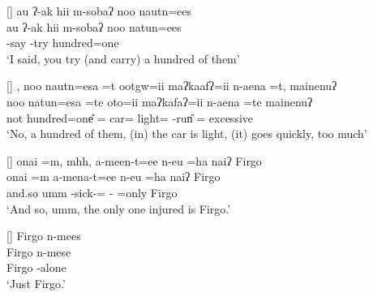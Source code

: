 \begin{exe}

[]{\glll
	au ʔ-ak hii m-sobaʔ noo nautn=ees \\
	au ʔ-ak hii m-sobaʔ noo natun=ees \\
	{\au} \q-say {\hii} \m-try {\manaq} hundred=one \\
\glt `I said, you try (and carry) a hundred of them'}

[]{\glll
	, noo nautn=esa =t ootgw=ii maʔkaafʔ=ii n-aena =t, mainenuʔ \\
	 noo natun=esa =te oto=ii maʔkafaʔ=ii n-aena =te mainenuʔ \\
	not {\manaq} hundred=one{\U} ={\te} car={\ii} light={\ii} \n-run{\U} ={\te} excessive \\
\glt `No, a hundred of them, (in) the car is light, (it) goes quickly, too much'}

\newpage
{}
[]{\glll
	{onai =m}, mhh, a-meen-t=ee n-eu =ha naiʔ Firgo\\
	{onai =m} {} a-mena-t=ee n-eu =ha naiʔ Firgo \\
	and.so umm {\at}-sick-{\at}={\ee} \n-{\eu} =only {\naiq} Firgo \\
\glt `And so, umm, the only one injured is Firgo.'}

\vspace{-4pt}
[]{\glll
	Firgo n-mees \\
	Firgo n-mese \\
	Firgo \n-alone \\
\glt `Just Firgo.'}

\end{exe}

